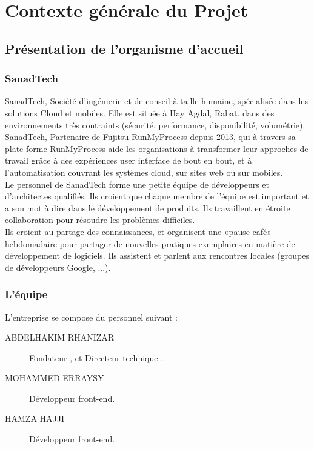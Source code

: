 
\chapter{Contexte générale du Projet} %

\label{Chapitre 1} %



\section{Présentation de l’organisme d’accueil}

\subsection{SanadTech}
SanadTech, Société d'ingénierie et de conseil à taille humaine, spécialisée dans les solutions Cloud et mobiles. Elle est située à Hay Agdal, Rabat. dans des environnements très contraints (sécurité, performance, disponibilité, volumétrie).\\[0.5cm]
SanadTech, Partenaire de Fujitsu RunMyProcess depuis 2013, qui à travers sa plate-forme RunMyProcess aide les organisations à transformer leur approches de travail grâce à des expériences user interface de bout en bout, et à l'automatisation couvrant les systèmes cloud, sur sites web ou sur mobiles.\\[0.5cm]
Le personnel de SanadTech forme une petite équipe de développeurs et d'architectes qualifiés. Ils croient que chaque membre de l'équipe est important et a son mot à dire dans le développement de produits. Ils travaillent en étroite collaboration pour résoudre les problèmes difficiles.\\[0.5cm]
Ils croient au partage des connaissances, et organisent une «pause-café» hebdomadaire pour partager de nouvelles pratiques exemplaires en matière de développement de logiciels. Ils assistent et parlent aux rencontres locales (groupes de développeurs Google, ...).
\subsection{L'équipe}
L'entreprise se compose du personnel suivant :
\begin{description}
 \item[ABDELHAKIM RHANIZAR] Fondateur , et Directeur technique .
 \item[MOHAMMED ERRAYSY] Développeur front-end.
 \item[HAMZA HAJJI] Développeur front-end.
 \end{description} 


